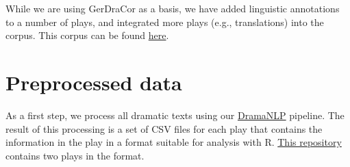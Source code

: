\documentclass[]{book}
\begin{document}
While we are using GerDraCor as a basis, we have added linguistic annotations to a number of plays, and integrated more plays (e.g., translations) into the corpus. This corpus can be found \href{https://github.com/quadrama/Corpus}{here}.

\hypertarget{preprocessed-data}{%
\section{Preprocessed data}\label{preprocessed-data}}

As a first step, we process all dramatic texts using our \href{https://github.com/quadrama/DramaNLP}{DramaNLP} pipeline. The result of this processing is a set of CSV files for each play that contains the information in the play in a format suitable for analysis with R. \href{https://github.com/quadrama/data_test}{This repository} contains two plays in the format.
\end{document}
